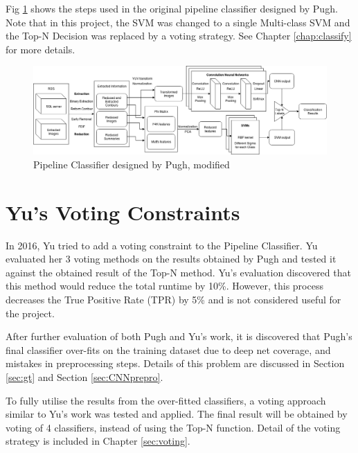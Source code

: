 \documentclass[bsc,logo,twoside,fullspacing,parskip]{infthesis}
\begin{document}
Fig \ref{fig:pipeline} shows the steps used in the original pipeline classifier designed by Pugh.
Note that in this project, the SVM was changed to a single Multi-class SVM and the Top-N Decision was replaced by a voting strategy.
See Chapter \ref{chap:classify} for more details.

\begin{figure}[!h]
    \centering
    \includegraphics[scale=0.35]{graph/Pipeline_Classifier.png}
    \caption{Pipeline Classifier designed by Pugh, modified}
    \label{fig:pipeline}
\end{figure}

\section{Yu's Voting Constraints}

In 2016, Yu\cite{Yu} tried to add a voting constraint to the Pipeline Classifier. 
Yu evaluated her 3 voting methods on the results obtained by Pugh and tested it against the obtained result of the Top-N method. 
Yu's evaluation discovered that this method would reduce the total runtime by 10\%. 
However, this process decreases the True Positive Rate (TPR) by 5\% and is not considered useful for the project. 

After further evaluation of both Pugh and Yu's work, it is discovered that Pugh's final classifier over-fits on the training dataset due to deep net coverage, and mistakes in preprocessing steps. Details of this problem are discussed in Section \ref{sec:gt} and Section \ref{sec:CNNprepro}. 

To fully utilise the results from the over-fitted classifiers, a voting approach similar to Yu's work was tested and applied. 
The final result will be obtained by voting of 4 classifiers, instead of using the Top-N function.
Detail of the voting strategy is included in Chapter \ref{sec:voting}.

\end{document}
